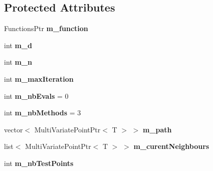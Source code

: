 \subsection*{Protected Attributes}
\begin{DoxyCompactItemize}
\item 
Functions\+Ptr {\bfseries m\+\_\+function}\hypertarget{class_interpolation_a1d7348655db682cf1971673e4c8a831e}{}\label{class_interpolation_a1d7348655db682cf1971673e4c8a831e}

\item 
int {\bfseries m\+\_\+d}\hypertarget{class_interpolation_a443a4adfcf1c009f6c5b7baa6407f40c}{}\label{class_interpolation_a443a4adfcf1c009f6c5b7baa6407f40c}

\item 
int {\bfseries m\+\_\+n}\hypertarget{class_interpolation_abbe38da255bd36ef9aef84b2b47224f5}{}\label{class_interpolation_abbe38da255bd36ef9aef84b2b47224f5}

\item 
int {\bfseries m\+\_\+max\+Iteration}\hypertarget{class_interpolation_a40333130b73c116dbf91b4c1494352a9}{}\label{class_interpolation_a40333130b73c116dbf91b4c1494352a9}

\item 
int {\bfseries m\+\_\+nb\+Evals} = 0\hypertarget{class_interpolation_ab1053117b2e9f7d109d1112ed7f7f655}{}\label{class_interpolation_ab1053117b2e9f7d109d1112ed7f7f655}

\item 
int {\bfseries m\+\_\+nb\+Methods} = 3\hypertarget{class_interpolation_a9f229e17580670cdec62b6c3e9b27536}{}\label{class_interpolation_a9f229e17580670cdec62b6c3e9b27536}

\item 
vector$<$ Multi\+Variate\+Point\+Ptr$<$ T $>$ $>$ {\bfseries m\+\_\+path}\hypertarget{class_interpolation_a8d527c0f05637a07fc8008259d0fb000}{}\label{class_interpolation_a8d527c0f05637a07fc8008259d0fb000}

\item 
list$<$ Multi\+Variate\+Point\+Ptr$<$ T $>$ $>$ {\bfseries m\+\_\+curent\+Neighbours}\hypertarget{class_interpolation_aac1da69ffdcc1ea7b4cf477b8cf104ca}{}\label{class_interpolation_aac1da69ffdcc1ea7b4cf477b8cf104ca}

\item 
int {\bfseries m\+\_\+nb\+Test\+Points}\hypertarget{class_interpolation_a6fb34c189b52d7dab010e8c0cd673bbe}{}\label{class_interpolation_a6fb34c189b52d7dab010e8c0cd673bbe}


\end{DoxyCompactItemize}
